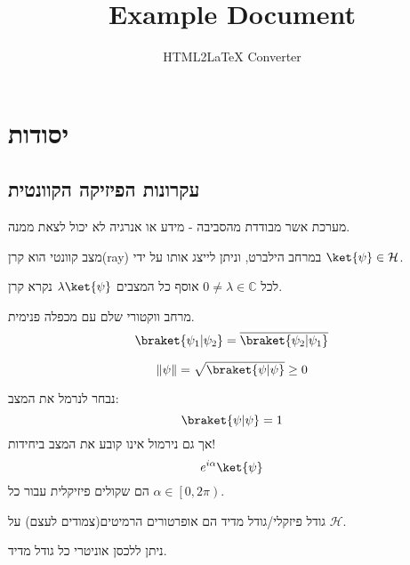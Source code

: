 \documentclass{tstextbook}
\begin{document}
\title{Example Document}
\author{HTML2LaTeX Converter}
\maketitle

\section{יסודות}

\subsection{עקרונות הפיזיקה הקוונטית}

\begin{definition}
מערכת אשר מבודדת מהסביבה - מידע או אנרגיה לא יכול לצאת ממנה.

\end{definition}
\begin{definition}
מצב קוונטי הוא קרן(ray) במרחב הילברט, וניתן לייצג אותו על ידי \(\ket{\psi} \in \mathcal{H}\).

\end{definition}
\begin{definition}[קרן]
לכל \(0\neq \lambda \in \mathbb{C}\) אוסף כל המצבים \(\lambda \ket{ \psi}\) נקרא קרן.

\end{definition}
\begin{reminder}
מרחב ווקטורי שלם עם מכפלה פנימית.
$$\braket{ \psi_{1} | \psi_{2} } =\overline{\braket{ \psi_{2} | \psi_{1} } } $$

\end{reminder}
\begin{definition}
$$\left\lVert  \psi  \right\rVert =\sqrt{ \braket{ \psi | \psi }  }\geq 0 $$

\end{definition}
\begin{remark}
נבחר לנרמל את המצב:
$$\braket{ \psi | \psi } =1$$
אך גם נירמול אינו קובע את המצב ביחידות!
$$e^{ i\alpha }\ket{\psi} $$
הם שקולים פיזיקלית עבור כל \(\alpha \in \left[ 0,2\pi \right)\).

\end{remark}
\begin{definition}
גודל פיזקלי/גודל מדיד הם אופרטורים הרמיטים(צמודים לעצם) על \(\mathcal{H}\).

\end{definition}
\begin{corollary}
ניתן ללכסן אוניטרי כל גודל מדיד.

\end{corollary}
\end{document}
